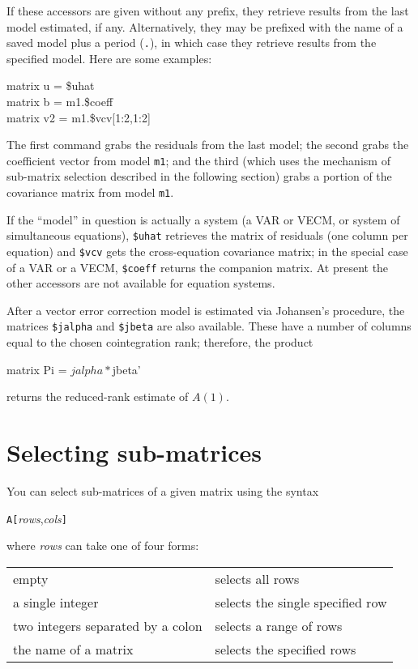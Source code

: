 If these accessors are given without any prefix, they retrieve results
from the last model estimated, if any.  Alternatively, they may be
prefixed with the name of a saved model plus a period (\texttt{.}), in
which case they retrieve results from the specified model.  Here are
some examples:
%
\begin{textcode}
matrix u = \$uhat\\
matrix b = m1.\$coeff\\
matrix v2 = m1.\$vcv[1:2,1:2]
\end{textcode}
%
The first command grabs the residuals from the last model; the second
grabs the coefficient vector from model \texttt{m1}; and the third
(which uses the mechanism of sub-matrix selection described in the
following section) grabs a portion of the covariance matrix from model
\texttt{m1}.

If the ``model'' in question is actually a system (a VAR or VECM, or
system of simultaneous equations), \texttt{\$uhat} retrieves the
matrix of residuals (one column per equation) and \texttt{\$vcv} gets
the cross-equation covariance matrix; in the special case of a VAR or
a VECM, \texttt{\$coeff} returns the companion matrix. At present the
other accessors are not available for equation systems.

After a vector error correction model is estimated via Johansen's
procedure, the matrices \texttt{\$jalpha} and \texttt{\$jbeta} are
also available. These have a number of columns equal to the chosen
cointegration rank; therefore, the product
\begin{code}
  matrix Pi = $jalpha * $jbeta'
\end{code}
returns the reduced-rank estimate of $A(1)$.

\section{Selecting sub-matrices}
\label{matrix-sub}

You can select sub-matrices of a given matrix using the syntax

\texttt{A[}\textsl{rows},\textsl{cols}\texttt{]}

where \textsl{rows} can take one of four forms:

\begin{center}
\begin{tabular}{ll}
empty & selects all rows \\
a single integer & selects the single specified row \\
two integers separated by a colon & selects a range of rows \\
the name of a matrix & selects the specified rows \\
\end{tabular}
\end{center}

